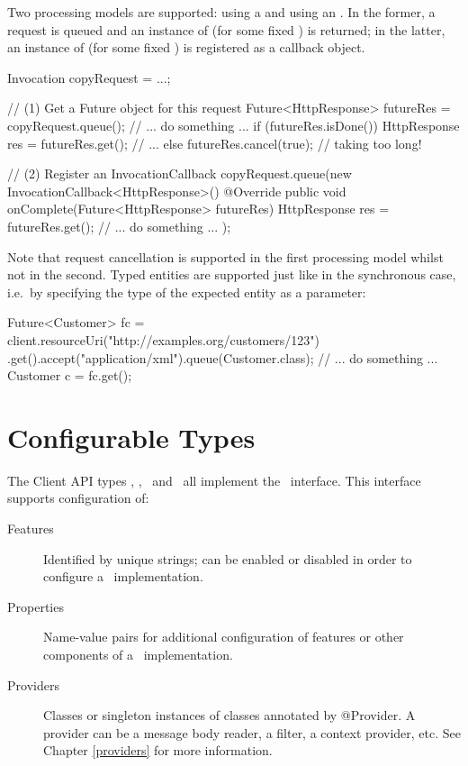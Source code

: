 Two processing models are supported: using a  and using an . In the former, a request is queued and an instance of  (for some fixed ) is returned; in the latter, an instance of  (for some fixed ) is registered as a callback object.

\begin{listing}{1}
Invocation copyRequest = ...;

// (1) Get a Future object for this request
Future<HttpResponse> futureRes = copyRequest.queue();
// ... do something ...
if (futureRes.isDone()) {
    HttpResponse res = futureRes.get();
    // ...
} else {
    futureRes.cancel(true);        // taking too long!
}

// (2) Register an InvocationCallback
copyRequest.queue(new InvocationCallback<HttpResponse>() {
    @Override
    public void onComplete(Future<HttpResponse> futureRes) { 
        HttpResponse res = futureRes.get();
        // ... do something ... 
    }
});
\end{listing}

Note that request cancellation is supported in the first processing model whilst not in the second. Typed entities are supported just like in the synchronous case, i.e.~by specifying the type of the expected entity as a parameter:

\begin{listing}{1}
Future<Customer> fc = client.resourceUri("http://examples.org/customers/123")
    .get().accept("application/xml").queue(Customer.class);
// ... do something ...
Customer c = fc.get();
\end{listing}

\section{Configurable Types}

The Client API types \Client, \ClientConfiguration, \ResourceUri\ and \Invocation\ all implement the \Configurable\ interface. This interface supports configuration of:

\begin{description}
\item [Features] Identified by unique strings; can be enabled or disabled in order to configure a \jaxrs\ implementation.
\item [Properties] Name-value pairs for additional configuration of features or other components of a \jaxrs\ implementation.
\item [Providers] Classes or singleton instances of classes annotated by @Provider. A provider can be a message body reader, a filter, a context provider, etc. See Chapter \ref{providers} for more information.
\end{description}

